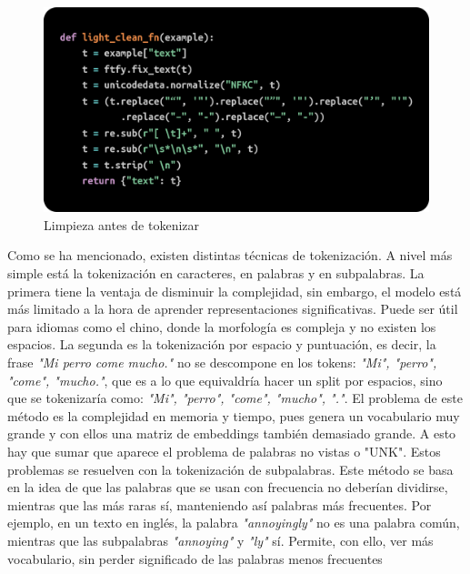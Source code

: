 \documentclass[11pt]{book}
\theoremstyle{plain}
\theoremstyle{definition}
\begin{document}
\begin{figure}[h]
    \centering
    \includegraphics[width=0.5\linewidth]{img/preclean.png}
    \caption{Limpieza antes de tokenizar}
    \label{fig:placeholder2}
\end{figure}
Como se ha mencionado, existen distintas técnicas de tokenización. A nivel más simple está la tokenización en caracteres, en palabras y en subpalabras. La primera tiene la ventaja de disminuir la complejidad, sin embargo, el modelo está más limitado a la hora de aprender representaciones significativas. Puede ser útil para idiomas como el chino, donde la morfología es compleja y no existen los espacios. La segunda es la tokenización por espacio y puntuación, es decir, la frase \textit{"Mi perro come mucho."} no se descompone en los tokens: \textit{"Mi", "perro", "come", "mucho."}, que es a lo que equivaldría hacer un split por espacios, sino que se tokenizaría como: \textit{"Mi", "perro", "come", "mucho", "."}. El problema de este método es la complejidad en memoria y tiempo, pues genera un vocabulario muy grande y con ellos una matriz de embeddings también demasiado grande. A esto hay que sumar que aparece el problema de palabras no vistas o "UNK". 
Estos problemas se resuelven con la tokenización de subpalabras. Este método se basa en la idea de que las palabras que se usan con frecuencia no deberían dividirse, mientras que las más raras sí, manteniendo así palabras más frecuentes. Por ejemplo, en un texto en inglés, la palabra \textit{"annoyingly"} no es una palabra común, mientras que las subpalabras \textit{"annoying"} y \textit{"ly"} sí. Permite, con ello, ver más vocabulario, sin perder significado de las palabras menos frecuentes \parencite{lmpo2020bpe}
\end{document}
